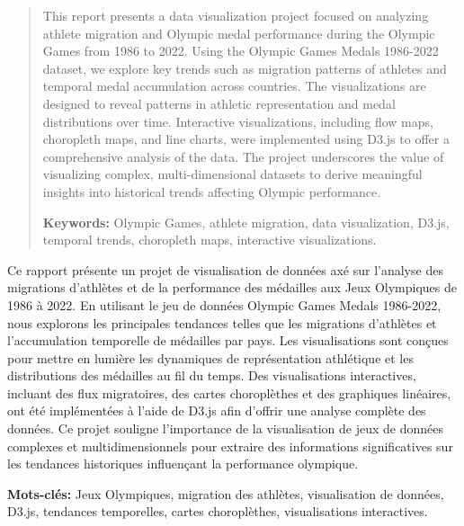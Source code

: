 \begin{abstract}

    This report presents a data visualization project focused on analyzing athlete migration and Olympic medal performance during the Olympic Games from 1986 to 2022. Using the Olympic Games Medals 1986-2022 dataset, we explore key trends such as migration patterns of athletes and temporal medal accumulation across countries. The visualizations are designed to reveal patterns in athletic representation and medal distributions over time. Interactive visualizations, including flow maps, choropleth maps, and line charts, were implemented using D3.js to offer a comprehensive analysis of the data. The project underscores the value of visualizing complex, multi-dimensional datasets to derive meaningful insights into historical trends affecting Olympic performance.

    \vspace{1\baselineskip}

    \textbf{Keywords:} Olympic Games, athlete migration, data visualization, D3.js, temporal trends, choropleth maps, interactive visualizations.

\end{abstract}


\begin{secondAbstract}

    Ce rapport présente un projet de visualisation de données axé sur l'analyse des migrations d'athlètes et de la performance des médailles aux Jeux Olympiques de 1986 à 2022. En utilisant le jeu de données Olympic Games Medals 1986-2022, nous explorons les principales tendances telles que les migrations d'athlètes et l'accumulation temporelle de médailles par pays. Les visualisations sont conçues pour mettre en lumière les dynamiques de représentation athlétique et les distributions des médailles au fil du temps. Des visualisations interactives, incluant des flux migratoires, des cartes choroplèthes et des graphiques linéaires, ont été implémentées à l'aide de D3.js afin d'offrir une analyse complète des données. Ce projet souligne l'importance de la visualisation de jeux de données complexes et multidimensionnels pour extraire des informations significatives sur les tendances historiques influençant la performance olympique.

    \vspace{1\baselineskip}

    \textbf{Mots-clés:} Jeux Olympiques, migration des athlètes, visualisation de données, D3.js, tendances temporelles, cartes choroplèthes, visualisations interactives.

\end{secondAbstract}
